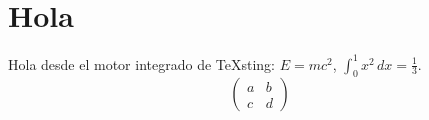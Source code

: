 \documentclass{article}
\begin{document}
\section{Hola}
Hola desde el motor integrado de TeXsting: $E = mc^2$, $\displaystyle\int_0^1 x^2\,dx = \frac13$.
\[ \begin{pmatrix} a & b\\ c & d \end{pmatrix} \]
\end{document}
